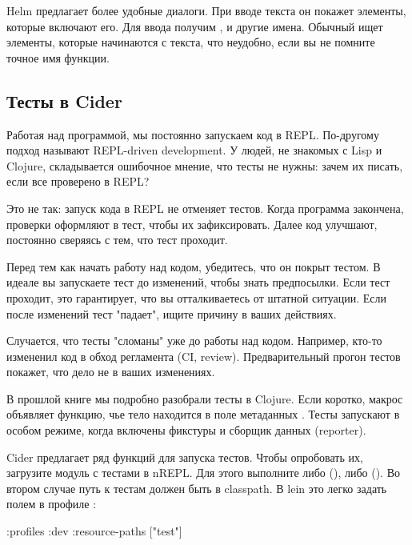 Helm предлагает более удобные диалоги. При вводе текста он покажет элементы, которые включают его. Для ввода  получим ,  и другие имена. Обычный  ищет элементы, которые начинаются с текста, что неудобно, если вы не помните точное имя функции.

\subsection{Тесты в Cider}

Работая над программой, мы постоянно запускаем код в REPL. По-другому подход называют REPL-driven development. У людей, не знакомых с Lisp и Clojure, складывается ошибочное мнение, что тесты не нужны: зачем их писать, если все проверено в REPL?

Это не так: запуск кода в REPL не отменяет тестов. Когда программа закончена, проверки оформляют в тест, чтобы их зафиксировать. Далее код улучшают, постоянно сверяясь с тем, что тест проходит.

Перед тем как начать работу над кодом, убедитесь, что он покрыт тестом. В идеале вы запускаете тест до изменений, чтобы знать предпосылки. Если тест проходит, это гарантирует, что вы отталкиваетесь от штатной ситуации. Если после изменений тест "падает", ищите причину в ваших действиях.

Случается, что тесты "сломаны" уже до работы над кодом. Например, кто-то измененил код в обход регламента (CI, review). Предварительный прогон тестов покажет, что дело не в ваших изменениях.

В прошлой книге мы подробно разобрали тесты в Clojure. Если коротко, макрос  объявляет функцию, чье тело находится в поле метаданных . Тесты запускают в особом режиме, когда включены фикстуры и сборщик данных (reporter).

Cider предлагает ряд функций для запуска тестов. Чтобы опробовать их, загрузите модуль с тестами в nREPL. Для этого выполните либо  (), либо  (). Во втором случае путь к тестам должен быть в classpath. В lein это легко задать полем  в профиле :

\begin{english}
  \begin{clojure}
{:profiles
 {:dev
  {:resource-paths ["test"]}}}
  \end{clojure}
\end{english}

